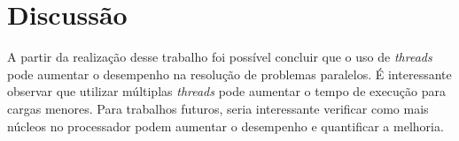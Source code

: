 \documentclass[12pt, a4paper]{article}
\begin{document}
\section{Discussão}
A partir da realização desse trabalho foi possível concluir que o uso de
\emph{threads} pode aumentar o desempenho na resolução de problemas paralelos.
É interessante observar que utilizar múltiplas \emph{threads} pode aumentar o
tempo de execução para cargas menores.  Para trabalhos futuros, seria
interessante verificar como mais núcleos no processador podem aumentar o
desempenho e quantificar a melhoria.
\end{document}
